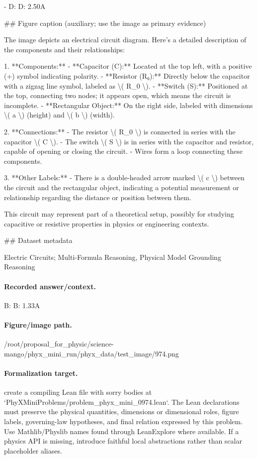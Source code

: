 - D: D: 2.50A

\#\# Figure caption (auxiliary; use the image as primary evidence)

The image depicts an electrical circuit diagram. Here's a detailed description of the components and their relationships:

1. **Components:**
   - **Capacitor (C):** Located at the top left, with a positive (+) symbol indicating polarity.
   - **Resistor (R₀):** Directly below the capacitor with a zigzag line symbol, labeled as \textbackslash{}( R\_0 \textbackslash{}).
   - **Switch (S):** Positioned at the top, connecting two nodes; it appears open, which means the circuit is incomplete.
   - **Rectangular Object:** On the right side, labeled with dimensions \textbackslash{}( a \textbackslash{}) (height) and \textbackslash{}( b \textbackslash{}) (width).

2. **Connections:**
   - The resistor \textbackslash{}( R\_0 \textbackslash{}) is connected in series with the capacitor \textbackslash{}( C \textbackslash{}).
   - The switch \textbackslash{}( S \textbackslash{}) is in series with the capacitor and resistor, capable of opening or closing the circuit.
   - Wires form a loop connecting these components.

3. **Other Labels:**
   - There is a double-headed arrow marked \textbackslash{}( c \textbackslash{}) between the circuit and the rectangular object, indicating a potential measurement or relationship regarding the distance or position between them.

This circuit may represent part of a theoretical setup, possibly for studying capacitive or resistive properties in physics or engineering contexts.

\#\# Dataset metadata

Electric Circuits; Multi-Formula Reasoning, Physical Model Grounding Reasoning

\paragraph{Recorded answer/context.}
B: B: 1.33A

\paragraph{Figure/image path.}
/root/proposal\_for\_physic/science-mango/phyx\_mini\_run/phyx\_data/test\_image/974.png

\paragraph{Formalization target.}
create a compiling Lean file with sorry bodies at `PhyXMiniProblems/problem\_phyx\_mini\_0974.lean`. The Lean declarations must preserve the physical quantities, dimensions or dimensional roles, figure labels, governing-law hypotheses, and final relation expressed by this problem.
Use Mathlib/Physlib names found through LeanExplore where available. If a physics API is missing, introduce faithful local abstractions rather than scalar placeholder aliases.

